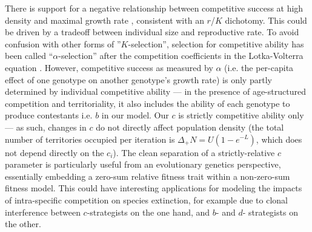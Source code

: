 \documentclass[11pt]{article}
\begin{document}

There is support for a negative relationship between competitive success at high density and maximal growth rate \citep{luckinbill_1979}, consistent with an $r$/$K$ dichotomy. This could be driven by a tradeoff between individual size and reproductive rate. To avoid confusion with other forms of ''$K$-selection'', selection for competitive ability has been called ``$\alpha$-selection'' after the competition coefficients in the Lotka-Volterra equation \citep{gill_1974,case_1974,joshi_2001}. However, competitive success as measured by $\alpha$ (i.e. the per-capita effect of one genotype on another genotype's growth rate) is only partly determined by individual competitive ability --- in the presence of age-structured competition and territoriality, it also includes the ability of each genotype to produce contestants i.e. $b$ in our model. Our $c$ is strictly competitive ability only --- as such, changes in $c$ do not directly affect population density (the total number of territories occupied per iteration is $\Delta_+ N=U(1-e^{-L})$, which does not depend directly on the $c_i$). The clean separation of a strictly-relative $c$ parameter is particularly useful from an evolutionary genetics perspective, essentially embedding a zero-sum relative fitness trait within a non-zero-sum fitness model. This could have interesting applications for modeling the impacts of intra-specific competition on species extinction, for example due to clonal interference \citep{gerrish_1998,desai_2007} between $c$-strategists on the one hand, and $b$- and $d$- strategists on the other.
\end{document}
